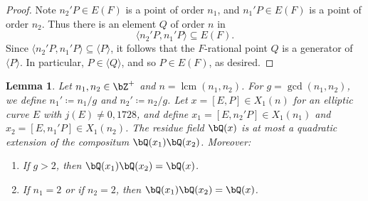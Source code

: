\documentclass[11pt,reqno]{amsart}
\theoremstyle{plain}
\newtheorem{lemma}[theorem]{Lemma}
\theoremstyle{definition}
\DeclareMathOperator{\lcm}{lcm}
\newcommand{\Q}{\bQ}
\newcommand{\Z}{\bZ}
\begin{document}
\begin{proof}
Note $n_2'P \in E(F)$ is a point of order $n_1$, and $n_1'P \in E(F)$ is a point of order $n_2$.  Thus there is an element $Q$ of order $n$ in
\[
\langle n_2'P, n_1' P \rangle \subseteq E(F).
\] Since $\langle n_2'P, n_1' P \rangle \subseteq \langle P \rangle$, it follows that the $F$-rational point $Q$ is a generator of $\langle P \rangle$. In particular, $P\in \langle Q \rangle$, and so $P\in E(F)$, as desired.
\end{proof}

\begin{lemma} \label{lem:compositum_res_fields}
Let $n_1,n_2 \in \Z^+$ and $n = \lcm(n_1,n_2)$. For $g=\gcd(n_1,n_2)$, we define $n_1'\coloneqq n_1/g$ and $n_2'\coloneqq n_2/g$. Let $x=[E,P] \in X_1(n)$ for an elliptic curve $E$ with $j(E) \neq 0,1728$, and define $x_1=[E,n_2'P] \in X_1(n_1)$ and $x_2=[E,n_1'P] \in X_1(n_2)$. The residue field $\Q(x)$ is at most a quadratic extension of the compositum $\Q(x_1)\Q(x_2)$. Moreover:
\begin{enumerate}
\item If $g>2$, then $\Q(x_1)\Q(x_2)=\Q(x)$.
\item If $n_1=2$ or if $n_2=2$, then $\Q(x_1)\Q(x_2)=\Q(x)$.
\end{enumerate}
\end{lemma}
\end{document}

